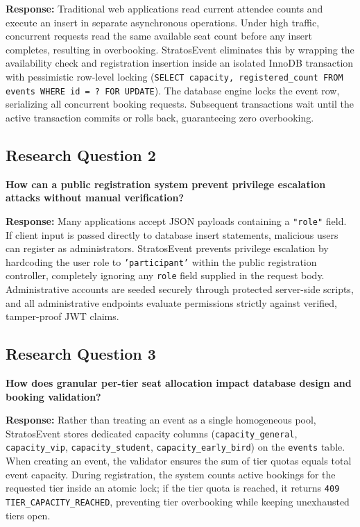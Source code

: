 \documentclass[11pt,a4paper]{article}
\begin{document}
\textbf{Response:}
Traditional web applications read current attendee counts and execute an insert in separate asynchronous operations. Under high traffic, concurrent requests read the same available seat count before any insert completes, resulting in overbooking. StratosEvent eliminates this by wrapping the availability check and registration insertion inside an isolated InnoDB transaction with pessimistic row-level locking (\texttt{SELECT capacity, registered\_count FROM events WHERE id = ? FOR UPDATE}). The database engine locks the event row, serializing all concurrent booking requests. Subsequent transactions wait until the active transaction commits or rolls back, guaranteeing zero overbooking.

\subsection*{Research Question 2}
\textbf{How can a public registration system prevent privilege escalation attacks without manual verification?}

\textbf{Response:}
Many applications accept JSON payloads containing a \texttt{"role"} field. If client input is passed directly to database insert statements, malicious users can register as administrators. StratosEvent prevents privilege escalation by hardcoding the user role to \texttt{'participant'} within the public registration controller, completely ignoring any \texttt{role} field supplied in the request body. Administrative accounts are seeded securely through protected server-side scripts, and all administrative endpoints evaluate permissions strictly against verified, tamper-proof JWT claims.

\subsection*{Research Question 3}
\textbf{How does granular per-tier seat allocation impact database design and booking validation?}

\textbf{Response:}
Rather than treating an event as a single homogeneous pool, StratosEvent stores dedicated capacity columns (\texttt{capacity\_general}, \texttt{capacity\_vip}, \texttt{capacity\_student}, \texttt{capacity\_early\_bird}) on the \texttt{events} table. When creating an event, the validator ensures the sum of tier quotas equals total event capacity. During registration, the system counts active bookings for the requested tier inside an atomic lock; if the tier quota is reached, it returns \texttt{409 TIER\_CAPACITY\_REACHED}, preventing tier overbooking while keeping unexhausted tiers open.
\end{document}
